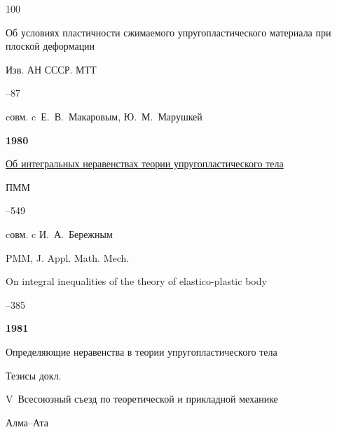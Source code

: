 \begin{thebibliography}{100}

\paper Об условиях пластичности сжимаемого упругопластического материала при плоской деформации 

\jour Изв. АН СССР. МТТ



–87

\miscnote cовм. c~Е.~В.~Макаровым, Ю.~М.~Марушкей





\item[] \centerline{\bf 1980}




\paper \href{https://zbmath.org/?q=an:0463.73029}{Об интегральных неравенствах теории упругопластического тела}

\jour ПММ




–549 

\miscnote cовм. c И.~А.~Бережным


\transl



\jour PMM, J. Appl. Math. Mech. 

\paper On integral inequalities of the theory of elastico-plastic body


--385 






\item[] \centerline{\bf 1981}




\paper Определяющие неравенства в теории упругопластического тела

\inbook Тезисы докл.

\bookinfo V~Всесоюзный съезд по теоретической и прикладной механике

\publaddr Алма--Ата



\end{thebibliography}
